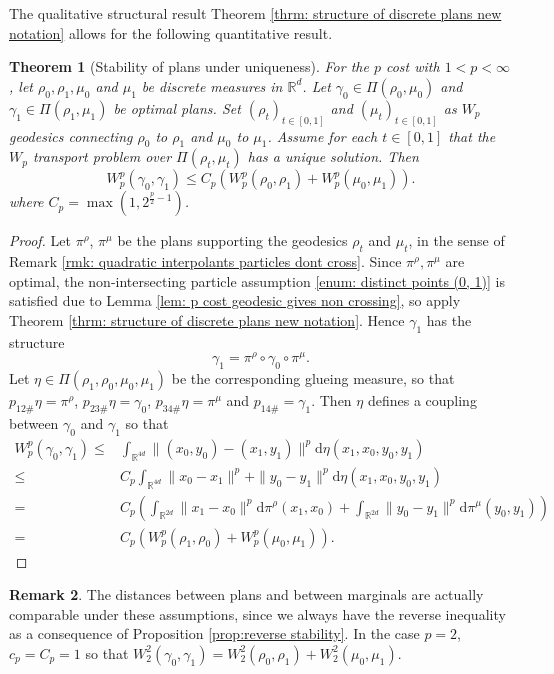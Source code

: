 \documentclass[11pt, oneside, titlepage]{book}
\theoremstyle{plain}
\newtheorem{theorem}{Theorem}[chapter]
\theoremstyle{definition}
\newtheorem{remark}[theorem]{Remark}
\newcommand{\R}{\mathbb{R}}
\newcommand{\di}{\mathrm{d}}
\begin{document}
The qualitative structural result Theorem \ref{thrm: structure of discrete plans new notation} allows for the following quantitative result.

\begin{theorem}[Stability of plans under uniqueness]
\label{thrm: stability of plans under uniqueness}
For the $p$ cost with $1<p<\infty$, let $\rho_0, \rho_1, \mu_0$ and $\mu_1$ be discrete measures in $\R^d$. Let $\gamma_0 \in \Pi(\rho_0, \mu_0)$ and $\gamma_1 \in \Pi(\rho_1, \mu_1)$ be optimal plans. Set $(\rho_t)_{t \in [0, 1]}$ and $(\mu_t)_{t \in [0, 1]}$ as $W_p$ geodesics connecting $\rho_0$ to $\rho_1$ and $\mu_0$ to $\mu_1$. Assume for each $t \in [0, 1]$ that the $W_p$ transport problem over $\Pi(\rho_t, \mu_t)$ has a unique solution. Then
\begin{equation*}
    W_p^p(\gamma_0, \gamma_1) \leq C_p (W_p^p(\rho_0, \rho_1) + W_p^p(\mu_0, \mu_1)).
\end{equation*}
where $C_p = \max(1, 2^{\frac{p}{2}-1})$.
\end{theorem}
\begin{proof}
Let $\pi^\rho$, $\pi^\mu$ be the plans supporting the geodesics $\rho_t$ and $\mu_t$, in the sense of Remark \ref{rmk: quadratic interpolants particles dont cross}. Since $\pi^\rho, \pi^\mu$ are optimal, the non-intersecting particle assumption \ref{enum: distinct points (0, 1)} is satisfied due to Lemma \ref{lem: p cost geodesic gives non crossing}, so apply Theorem \ref{thrm: structure of discrete plans new notation}. Hence $\gamma_1$ has the structure
\begin{equation*}
    \gamma_1 = \pi^\rho \circ \gamma_0 \circ \pi^\mu.
\end{equation*}
Let $\eta \in \Pi(\rho_1, \rho_0, \mu_0, \mu_1)$ be the corresponding glueing measure, so that $p_{12\#}\eta = \pi^\rho$, $p_{23\#}\eta = \gamma_0$, $p_{34\#}\eta = \pi^\mu$ and $p_{14\#}= \gamma_1$. Then $\eta$ defines a coupling between $\gamma_0$ and $\gamma_1$ so that
\begin{align*}
    W_p^p(\gamma_0, \gamma_1) \leq& \int_{\R^{4d}} \|(x_0, y_0)-(x_1, y_1)\|^p \di \eta(x_1, x_0, y_0, y_1)\\
    \leq& C_p \int_{\R^{4d}} \|x_0 -x_1\|^p + \|y_0 - y_1\|^p \di \eta(x_1, x_0, y_0, y_1)\\
    =& C_p\left(\int_{\R^{2d}} \|x_1 - x_0\|^p \di \pi^\rho(x_1, x_0) + \int_{\R^{2d}} \|y_0 - y_1\|^p \di \pi^\mu(y_0, y_1)\right)\\
    =& C_p(W^p_p(\rho_1, \rho_0) + W^p_p(\mu_0, \mu_1)).
\end{align*}
\end{proof}
\begin{remark}
The distances between plans and between marginals are actually comparable under these assumptions, since we always have the reverse inequality as a consequence of Proposition \ref{prop:reverse stability}. In the case $p=2$, $c_p = C_p = 1$ so that $W_2^2(\gamma_0, \gamma_1) = W_2^2(\rho_0, \rho_1) + W_2^2(\mu_0, \mu_1)$.
\end{remark}
\end{document}
